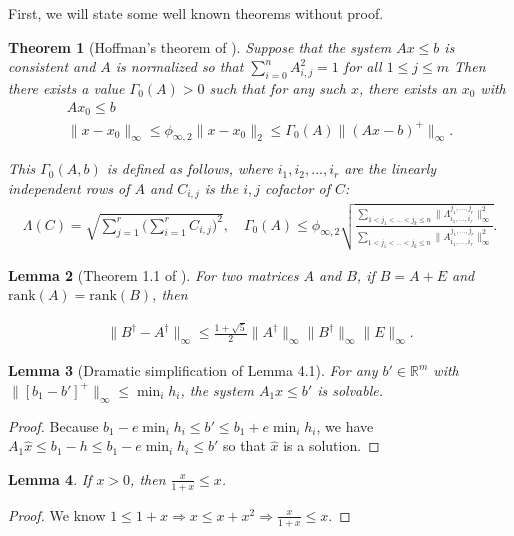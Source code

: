 \documentclass{article}
\newtheorem{theorem}{Theorem}[section]
\newtheorem{lemma}[theorem]{Lemma}
\theoremstyle{case}
\newcommand{\Rm}{\mathbb R^m}
\begin{document}
First, we will state some well known theorems without proof.
\begin{theorem}[Hoffman's theorem of \cite{dummy:hoffman}]
\label{hoffman}
Suppose that the system $Ax \le b$ is consistent and $A$ is normalized so that $\sum_{i = 0}^n{A}_{i,j}^2 = 1$ for all $1 \le j \le m$
Then there exists a value $\Gamma_0(A) > 0$ such that for any such $x$, there exists an $x_0$ with
\begin{align*}
Ax_0 \le b \\
\|x - x_0\|_{\infty} \le \phi_{\infty, 2}\|x - x_0\|_2 \le {\Gamma_0(A)} \|(Ax - b)^+\|_\infty.
\end{align*}

This $\Gamma_0(A,b)$ is defined as follows, where $i_1, i_2, \ldots, i_r$ are the linearly independent rows of $A$ and $C_{i,j}$ is the $i,j$ cofactor of $C$:
\begin{align*}
\Lambda(C) = \sqrt{\sum_{j=1}^r\bigg(\sum_{i=1}^r C_{i,j}\bigg)^2}, \quad
{\Gamma_0(A)} \le \phi_{\infty, 2}\sqrt{\frac{\sum_{1 < j_1 < \ldots < j_k \le n} \|\Lambda^{j_1,\ldots,j_r}_{i_1,\ldots, i_r}\|_{\infty}^2}{\sum_{1 < j_1 < \ldots < j_k \le n} \|A^{j_1,\ldots,j_r}_{i_1,\ldots, i_r}\|_{\infty}^2}}.
\end{align*}
\end{theorem}


\begin{lemma}[Theorem 1.1 of \cite{dummy:continuity_of_inverse}]
For two matrices $A$ and $B$, if $B = A + E$ and $\text{rank}(A) = \text{rank}(B)$, then

\begin{align*}
\|B^{\dagger} - A^{\dagger} \|_\infty \le \frac{1 + \sqrt{5}}{2} \|A^{\dagger}\|_\infty\|B^{\dagger}\|_\infty\|E\|_\infty.
\end{align*}
\end{lemma}



\begin{lemma}[Dramatic simplification of Lemma 4.1]
\label{4_1}
For any $b' \in \Rm$ with $\|\left[b_1 - b'\right]^+\|_{\infty} \le \min_i h_i$, the system $A_1x \le b'$ is solvable.
\end{lemma}

\begin{proof}
Because $b_1 - e \min_i h_i \le b' \le b_1 + e \min_i h_i$, we have $A_1\hat x\le b_1 - h\le b_1 - e \min_i h_i \le b'$ so that $\hat x$ is a solution.
\end{proof}


\begin{lemma}
\label{simple_bound}
If $x > 0$, then $\frac {x}{1+x} \le x$.
\end{lemma}
\begin{proof}
We know $1 \le 1 + x\Longrightarrow x \le x + x^2 \Longrightarrow \frac {x}{1+x} \le x$.
\end{proof}
\end{document}
